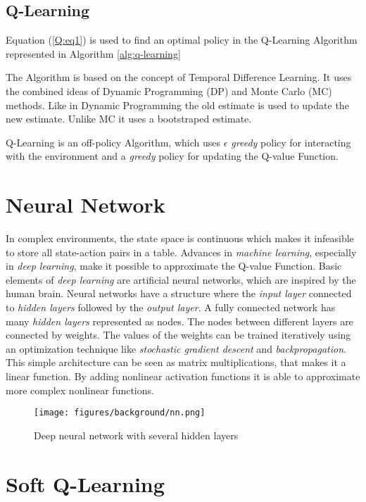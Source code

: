 \subsection{Q-Learning}
Equation (\ref{Q:eq1}) is used to find an optimal policy in the Q-Learning Algorithm represented in Algorithm \ref{alg:q-learning}

The Algorithm is based on the concept of Temporal Difference Learning.
It uses the combined ideas of Dynamic Programming (DP) and Monte Carlo (MC) methods.
Like in Dynamic Programming the old estimate is used to update the new estimate. Unlike MC it uses a bootstraped estimate.

Q-Learning is an off-policy Algorithm, which uses \textit{$\epsilon$  greedy}  policy for interacting with the environment and a \textit{greedy} policy for updating the Q-value Function.

\section{Neural Network}
In complex environments, the state space is continuous which makes it infeasible to store all state-action pairs in a table.
Advances in \textit{machine learning}, especially in \textit{deep learning}, make it possible to approximate the Q-value Function.  
Basic elements of \textit{deep learning} are artificial neural networks, which are inspired by the human brain.
Neural networks have a structure where the \textit{input layer} connected to \textit{hidden layers} followed by the \textit{output layer}. 
A fully connected network has many \textit{hidden layers} represented as nodes. The nodes between different layers are connected by weights. 
The values of the weights can be trained iteratively using an optimization technique like \textit{stochastic gradient descent} and \textit{backpropagation}.
This simple architecture can be seen as matrix multiplications, that makes it a linear function.
By adding nonlinear activation functions it is able to approximate more complex nonlinear functions.
\begin{figure}[h]
  \centering
  \texttt{[image: figures/background/nn.png]}
  \caption{Deep neural network with several hidden layers}
  \label{fig:tab-training}
\end{figure}



\section{Soft Q-Learning}

